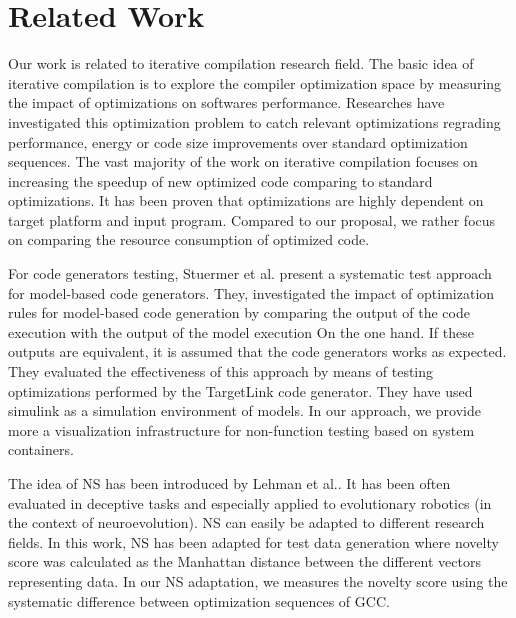 \section{Related Work}
Our work is related to iterative compilation research field.
The basic idea of iterative compilation is to explore
the compiler optimization space by measuring the impact of optimizations on softwares performance.
Researches have investigated this optimization problem to catch relevant optimizations regrading performance, energy or code size improvements over standard optimization sequences\cite{almagor2004finding,hoste2008cole,jantz2013performance,pan2006fast,zhong2009tuning,pallister2015identifying,chen2012deconstructing,sandran2012genetic,martins2014exploration,fursin2008milepost,lin2008automatic,schulte2014post}. The vast majority of the work on iterative compilation focuses on increasing the speedup of new optimized code comparing to standard optimizations. It has been proven that optimizations are highly dependent on target platform and input program. Compared to our proposal, we rather focus on comparing the resource consumption of optimized code.

For code generators testing, Stuermer et al.\cite{stuermer2007systematic} present a systematic test
approach for model-based code generators. They, investigated  the impact of optimization rules for model-based code generation by comparing the output of the code execution with the output of the model execution On the one hand. If these outputs are equivalent, it is assumed that the code generators works as expected. They evaluated the effectiveness of this approach by means of testing optimizations performed by the TargetLink code generator. They have used simulink as a simulation environment of models. In our approach, we provide more a visualization infrastructure for non-function testing based on system containers.

The idea of NS has been introduced by Lehman et al.\cite{lehman2008exploiting}. It has been often evaluated in deceptive tasks and especially applied to evolutionary robotics (in the context of neuroevolution)\cite{risi2010evolving,krvcah2012solving}. NS can easily be adapted to different research fields. In this work\cite{boussaa2015novelty}, NS has been adapted for test data generation where novelty score was calculated as the Manhattan distance between the different vectors representing data. In our NS adaptation, we measures the novelty score using the systematic difference between optimization sequences of GCC.